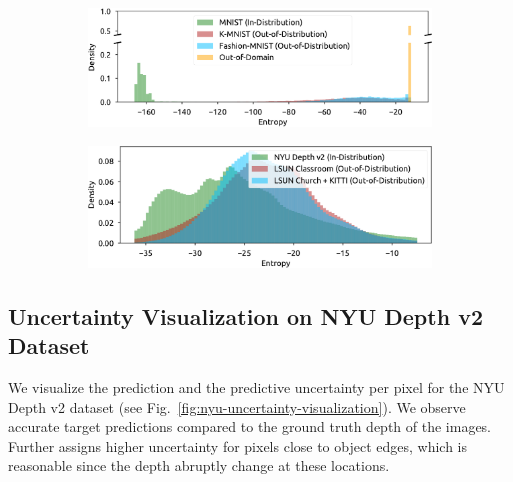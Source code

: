 \begin{figure}[ht!]
    \centering
    \caption{Histogram of the entropy of the posterior distribution accounting for the predictive uncertainty of \NatPNacro{} on MNIST (ID) vs KMNIST, Fashion-MNIST, Out-Of-Domain (OOD) and NYU (ID) vs LSUN classroom and LSUN church + KITTI (OOD). In both cases, low entropy is a good indicator of in-distribution data.}
    \label{fig:entropy-histograms}
    \begin{subfigure}[t]{.5\textwidth}
        \centering
    \includegraphics[width=1.\textwidth]{sections/007_iclr2022/resources/appendix/mnist-entropy-new.pdf}
    \end{subfigure}%
    \begin{subfigure}[t]{.5\textwidth}
        \centering
    \includegraphics[width=1.0\textwidth]{sections/007_iclr2022/resources/appendix/nyu-entropy-new-ii.pdf}
    \end{subfigure}%
\end{figure}

\subsection{Uncertainty Visualization on NYU Depth v2 Dataset}

We visualize the prediction and the predictive uncertainty per pixel for the NYU Depth v2 dataset (see Fig.~\ref{fig:nyu-uncertainty-visualization}). We observe accurate target predictions compared to the ground truth depth of the images. Further \NatPNacro{} assigns higher uncertainty for pixels close to object edges, which is reasonable since the depth abruptly change at these locations.

